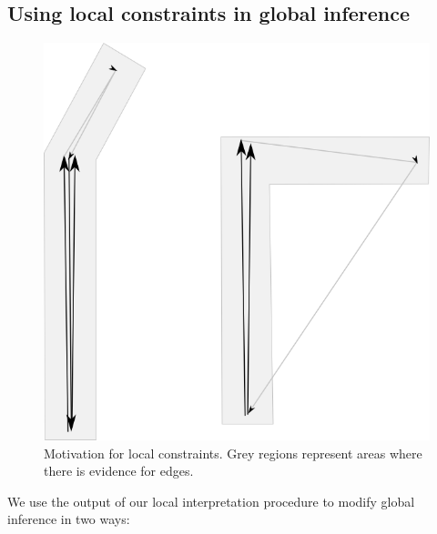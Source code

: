
\subsection{Using local constraints in global inference}

\begin{figure}
\includegraphics[width=\linewidth]{figures/local_constraints/local_constraints.png}
\caption{Motivation for local constraints. Grey regions represent
  areas where there is evidence for edges.}
\label{fig-local-constraints}
\end{figure}

We use the output of our local interpretation procedure to modify
global inference in two ways:


